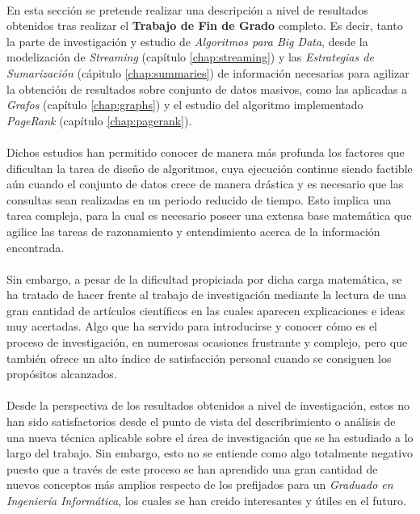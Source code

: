 \documentclass{subfiles}
\begin{document}
      \paragraph{}
      En esta sección se pretende realizar una descripción a nivel de resultados obtenidos tras realizar el \textbf{Trabajo de Fin de Grado} completo. Es decir, tanto la parte de investigación y estudio de \emph{Algoritmos para Big Data}, desde la modelización de \emph{Streaming} (capítulo \ref{chap:streaming}) y las \emph{Estrategias de Sumarización} (cápitulo \ref{chap:summaries}) de información necesarias para agilizar la obtención de resultados sobre conjunto de datos masivos, como las aplicadas a \emph{Grafos} (capítulo \ref{chap:graphs}) y el estudio del algoritmo implementado \emph{PageRank} (capítulo \ref{chap:pagerank}).

      \paragraph{}
      Dichos estudios han permitido conocer de manera más profunda los factores que dificultan la tarea de diseño de algoritmos, cuya ejecución continue siendo factible aún cuando el conjunto de datos crece de manera drástica y es necesario que las consultas sean realizadas en un periodo reducido de tiempo. Esto implica una tarea compleja, para la cual es necesario poseer una extensa base matemática que agilice las tareas de razonamiento y entendimiento acerca de la información encontrada.

      \paragraph{}
      Sin embargo, a pesar de la dificultad propiciada por dicha carga matemática, se ha tratado de hacer frente al trabajo de investigación mediante la lectura de una gran cantidad de artículos científicos en las cuales aparecen explicaciones e ideas muy acertadas. Algo que ha servido para introducirse y conocer cómo es el proceso de investigación, en numerosas ocasiones frustrante y complejo, pero que también ofrece un alto índice de satisfacción personal cuando se consiguen los propósitos alcanzados.

      \paragraph{}
      Desde la perspectiva de los resultados obtenidos a nivel de investigación, estos no han sido satisfactorios desde el punto de vista del describrimiento o análisis de una nueva técnica aplicable sobre el área de investigación que se ha estudiado a lo largo del trabajo. Sin embargo, esto no se entiende como algo totalmente negativo puesto que a través de este proceso se han aprendido una gran cantidad de nuevos conceptos más amplios respecto de los prefijados para un \emph{Graduado en Ingeniería Informática}, los cuales se han creido interesantes y útiles en el futuro.
\end{document}
